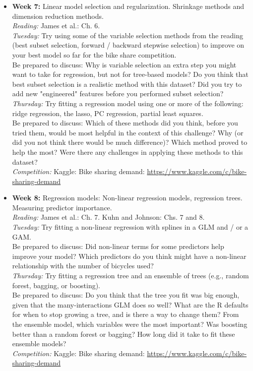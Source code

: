 \documentclass[11pt,oneside]{amsart}
\begin{document}
\begin{itemize}
\item \textbf{Week 7:} Linear model selection and
  regularization. Shrinkage methods and dimension reduction methods.\\
\emph{Reading:} James et al.: Ch. 6.\\
\emph{Tuesday:} Try using some of the variable selection methods from the reading (best subset selection, forward / backward stepwise selection) to improve on your best model so far for the bike share competition.\\
Be prepared to discuss: Why is variable selection an extra step you might want to take for regression, but not for tree-based models? Do you think that best subset selection is a realistic method with this dataset? Did you try to add new "engineered" features before you performed subset selection?\\
\emph{Thursday:} Try fitting a regression model using one or more of the following: ridge regression, the lasso, PC regression, partial least squares.\\ 
Be prepared to discuss: Which of these methods did you think, before you tried them, would be most helpful in the context of this challenge? Why (or did you not think there would be much difference)? Which method proved to help the most? Were there any challenges in applying these methods to this dataset?\\
\emph{Competition:} Kaggle: Bike sharing demand: \url{https://www.kaggle.com/c/bike-sharing-demand}

\item \textbf{Week 8:} Regression models: Non-linear regression
  models, regression trees. Measuring predictor importance.\\
\emph{Reading:} James et al.: Ch. 7. Kuhn and Johnson: Chs. 7 and 8.\\
\emph{Tuesday:} Try fitting a non-linear regression with splines in a GLM and / or a GAM.\\
Be prepared to discuss: Did non-linear terms for some predictors help improve your model? Which predictors do you think might have a non-linear relationship with the number of bicycles used?\\
\emph{Thursday:} Try fitting a regression tree and an ensemble of trees (e.g., random forest, bagging, or boosting).\\ 
Be prepared to discuss: Do you think that the tree you fit was big enough, given that the many-interactions GLM does so well? What are the R defaults for when to stop growing a tree, and is there a way to change them? From the ensemble model, which variables were the most important? Was boosting better than a random forest or bagging? How long did it take to fit these ensemble models?\\
\emph{Competition:} Kaggle: Bike sharing demand: \url{https://www.kaggle.com/c/bike-sharing-demand}


\end{itemize}
\end{document}
